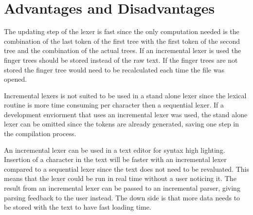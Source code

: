 \section{Advantages and Disadvantages}
The updating step of the lexer is fast since the only computation needed is the
combination of the last token of the first tree with the first token of the
second tree and the combination of the actual trees. If an incremental lexer is
used the finger trees should be stored instead of the raw text. If the finger
trees are not stored the finger tree would need to be recalculated each time the
file was opened.

Incremental lexers is not suited to be used in a stand alone lexer since the
lexical routine is more time consuming per character then a sequential lexer. If
a development enviorment that uses an incremental lexer was used, the stand
alone lexer can be omitted since the tokens are already generated, saving one
step in the compilation process.

An incremental lexer can be used in a text editor for syntax high lighting.
Insertion of a character in the text will be faster with an incremental lexer
compared to a sequential lexer since the text does not need to be revaluated.
This means that the lexer could be run in real time without a user noticing it.
The result from an incremental lexer can be passed to an incremental parser,
giving parsing feedback to the user instead. The down side is that more data
needs to be stored with the text to have fast loading time.
